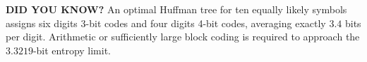 \begin{tcolorbox}[
  colback=SoftYellow,
  colframe=IEEEorange!75!black,
  boxrule=0.6pt,
  arc=0mm,
  left=3mm,right=3mm,top=1mm,bottom=1mm
]
\footnotesize
{\sffamily\bfseries\color{IEEEorange!75!black}DID YOU KNOW?}\quad
An optimal Huffman tree for ten equally likely symbols assigns six digits 3-bit codes and four digits 4-bit codes, averaging exactly $3.4$ bits per digit. Arithmetic or sufficiently large block coding is required to approach the $3.3219$-bit entropy limit.
\end{tcolorbox}